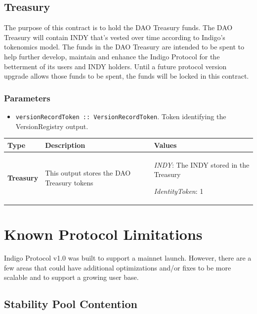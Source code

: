 \documentclass{article}
\begin{document}
\begin{sloppypar}
\hypertarget{treasury}{%
\subsection{Treasury}\label{treasury}}

The purpose of this contract is to hold the DAO Treasury funds. The DAO
Treasury will contain INDY that's vested over time according to Indigo's
tokenomics model. The funds in the DAO Treasury are intended to be spent
to help further develop, maintain and enhance the Indigo Protocol for
the betterment of its users and INDY holders. Until a future protocol
version upgrade allows those funds to be spent, the funds will be locked
in this contract.

\hypertarget{parameters-2}{%
\subsubsection{Parameters}\label{parameters-2}}

\begin{itemize}
\item
  \texttt{versionRecordToken~::~VersionRecordToken}. Token identifying
  the VersionRegistry output.
\end{itemize}

\begin{tabularx}{\linewidth}{l|L|L}
\caption{Treasury outputs}
\tabularnewline
\toprule
\textbf{Type} & \textbf{Description} & \textbf{Values}
\tabularnewline
\midrule
\endhead
\textbf{Treasury}
&
This output stores the DAO Treasury tokens
&
\emph{INDY}: The INDY stored in the Treasury

\emph{IdentityToken}: 1
\tabularnewline
\bottomrule
\end{tabularx}

\hypertarget{known-protocol-limitations}{%
\section{Known Protocol Limitations}\label{known-protocol-limitations}}

Indigo Protocol v1.0 was built to support a mainnet launch. However,
there are a few areas that could have additional optimizations and/or
fixes to be more scalable and to support a growing user base.

\hypertarget{stability-pool-contention}{%
\subsection{Stability Pool Contention}\label{stability-pool-contention}}


\end{sloppypar}
\end{document}
